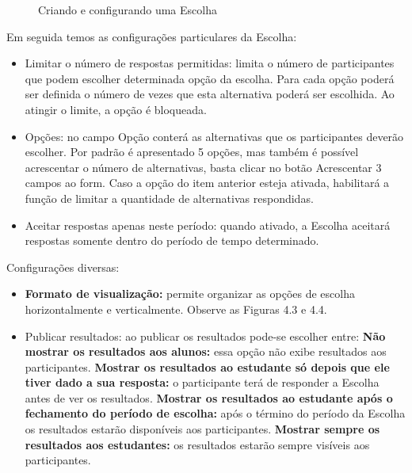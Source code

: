 \begin{figure}[htbp]
 \begin{center}
  \caption{Criando e configurando uma Escolha}
  \label{fig:cap5_17a}
 \end{center}
\end{figure}
Em seguida temos as configurações particulares da Escolha:
\begin{itemize}
 \item Limitar o número de respostas permitidas: limita o número de participantes que podem escolher determinada opção da escolha. Para cada opção poderá ser definida o número de vezes que esta alternativa poderá ser escolhida. Ao atingir o limite, a opção é bloqueada.
 \item Opções: no campo Opção conterá as alternativas que os participantes deverão escolher. Por padrão é apresentado 5 opções, mas também é possível acrescentar o número de alternativas, basta clicar no botão Acrescentar 3 campos ao form. Caso a opção do item anterior esteja ativada, habilitará a função de limitar a quantidade de alternativas respondidas.
 \item Aceitar respostas apenas neste período: quando ativado, a Escolha aceitará respostas somente dentro do período de tempo determinado.

\end{itemize}
Configurações diversas:
\begin{itemize}
 \item \textbf{Formato de visualização:} permite organizar as opções de escolha horizontalmente e verticalmente. Observe as Figuras 4.3 e 4.4.
 \item Publicar resultados: ao publicar os resultados pode-se escolher entre:
    \subitem \textbf{Não mostrar os resultados aos alunos:} essa opção não exibe resultados aos participantes.
    \subitem \textbf{Mostrar os resultados ao estudante só depois que ele tiver dado a sua resposta:} o participante terá de responder a Escolha antes de ver os resultados.
    \subitem \textbf{Mostrar os resultados ao estudante após o fechamento do período de escolha:} após o término do período da Escolha os resultados estarão disponíveis aos participantes.
    \subitem \textbf{Mostrar sempre os resultados aos estudantes:} os resultados estarão sempre visíveis aos participantes.

\end{itemize}

